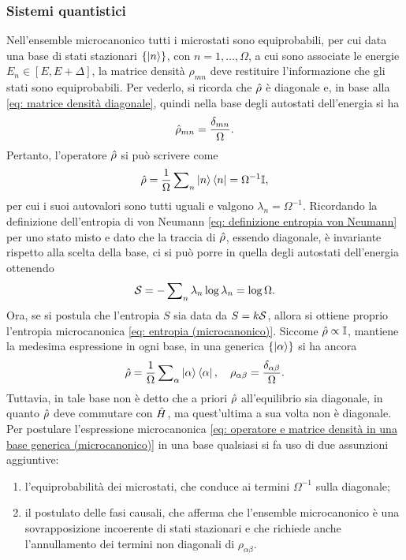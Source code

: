 \subsubsection{Sistemi quantistici}
Nell'ensemble microcanonico tutti i microstati sono equiprobabili, per cui data una base di stati stazionari $\{\ket{n}\}$, con $n = 1,\dots,\Omega$, a cui sono associate le energie $E_n \in [E,E + \Delta]$, la matrice densità $\rho_{mn}$ deve restituire l'informazione che gli stati sono equiprobabili. Per vederlo, si ricorda che $\hat{\rho}$ è diagonale e, in base alla \eqref{eq: matrice densità diagonale}, quindi nella base degli autostati dell'energia si ha 
\begin{equation}
    \hat{\rho}_{mn} = \frac{\delta_{mn}}{\Omega}.
\end{equation}
Pertanto, l'operatore $\hat{\rho}$ si può scrivere come
\begin{equation}
    \hat{\rho} = \frac{1}{\Omega}\sum\nolimits_n\ket{n}\bra{n} = \Omega^{-1}\mathbb{I},
\end{equation}
per cui i suoi autovalori sono tutti uguali e valgono $\lambda_n = \Omega^{-1}$. Ricordando la definizione dell'entropia di von Neumann \eqref{eq: definizione entropia von Neumann} per uno stato misto e dato che la traccia di $\hat{\rho}$, essendo diagonale, è invariante rispetto alla scelta della base, ci si può porre in quella degli autostati dell'energia ottenendo
\begin{equation}
    \mathcal{S} = -\sum\nolimits_n\lambda_n\log{\lambda_n} = \log{\Omega}.
\end{equation}
Ora, se si postula che l'entropia $S$ sia data da $S = k\mathcal{S}$, allora si ottiene proprio l'entropia microcanonica \eqref{eq: entropia (microcanonico)}. Siccome $\hat{\rho} \propto \mathbb{I}$, mantiene la medesima espressione in ogni base, in una generica $\{\ket{\alpha}\}$ si ha ancora
\begin{equation}
\label{eq: operatore e matrice densità in una base generica (microcanonico)}
    \hat{\rho} = \frac{1}{\Omega}\sum\nolimits_\alpha\ket{\alpha}\bra{\alpha},\quad\rho_{\alpha\beta} = \frac{\delta_{\alpha\beta}}{\Omega}.
\end{equation}
Tuttavia, in tale base non è detto che a priori $\hat{\rho}$ all'equilibrio sia diagonale, in quanto $\hat{\rho}$ deve commutare con $\hat{H}$, ma quest'ultima a sua volta non è diagonale. Per postulare l'espressione microcanonica \eqref{eq: operatore e matrice densità in una base generica (microcanonico)} in una base qualsiasi si fa uso di due assunzioni aggiuntive:
\begin{enumerate}
    \item l'equiprobabilità dei microstati, che conduce ai termini $\Omega^{-1}$ sulla diagonale;
    \item il postulato delle fasi causali, che afferma che l'ensemble microcanonico è una sovrapposizione incoerente di stati stazionari e che richiede anche l'annullamento dei termini non diagonali di $\rho_{\alpha\beta}$.
\end{enumerate}

